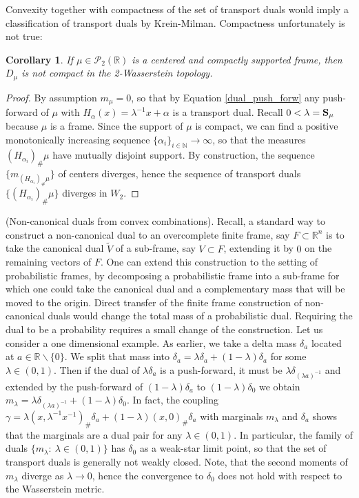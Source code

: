 \documentclass{amsart}
\numberwithin{equation}{section}
\newcommand\cP{{\mathcal P}}
\newcommand\bS{{\bf S}}
\newcommand\R{{\mathbb R}}
\newcommand\N{{\mathbb N}}
\theoremstyle{plain}
\newtheorem{corollary}[subsection]{Corollary}
\theoremstyle{definition}
\begin{document}
\noindent Convexity together with compactness of the set of transport duals would imply a classification of transport duals by Krein-Milman. 
Compactness unfortunately is not true:  
\begin{corollary} \label{non-compactness}
If $\mu \in \cP_2(\R)$ is a centered and compactly supported frame, then $D_{\mu}$ is not compact in the 2-Wasserstein topology.      
\end{corollary}
\begin{proof}
By assumption $m_{\mu}=0$, so that by Equation \ref{dual_push_forw} any push-forward of $\mu$ with $H_{\alpha}(x)=\lambda^{-1}x + \alpha$ is a transport dual. Recall $0< \lambda=\bS_{\mu}$ because $\mu$ is a frame.  Since the support of $\mu$ is compact, we can find a positive monotonically increasing sequence $\{\alpha_i\}_{i\in \N} \rightarrow \infty$,  
so that the measures $(H_{\alpha_i})_{\#}\mu$ have mutually disjoint support. By construction, the sequence $\{m_{(H_{\alpha_i})_{\#}\mu}\}$ of centers diverges, hence the sequence of transport duals $\{(H_{\alpha_i})_{\#}\mu\}$ diverges in $W_2$.  
\end{proof}





 (Non-canonical duals from convex combinations). Recall, a standard way to construct a non-canonical dual to an overcomplete finite frame, say $F \subset \R^n$ is to take the canonical dual $\widetilde{V}$ of a sub-frame, say $V \subset F$,  extending it by $0$ on the 
remaining vectors of $F$. 
One can extend this construction to the setting of probabilistic frames, by decomposing a probabilistic frame into 
a sub-frame for which one could take the canonical dual and a complementary mass that will be moved to the origin. 
Direct transfer of the finite frame construction of non-canonical duals would change the total mass of a probabilistic dual. 
Requiring the dual to be a probability requires a small change of the construction.   
Let us consider a one dimensional example. As earlier, we take a delta mass $\delta_a$ located at $a \in \R\backslash \{ 0 \}$. 
We split that mass into $\delta_a=\lambda \delta_a+ (1-\lambda)\delta_a$ for some $\lambda \in (0,1)$. 
Then if the dual of $\lambda \delta_a$  is a push-forward, it must be $\lambda \delta_{(\lambda a)^{-1}}$ and extended by the push-forward 
of $(1-\lambda)\delta_a$ to $(1-\lambda)\delta_0$ we obtain $m_{\lambda}=\lambda \delta_{(\lambda a)^{-1}} + (1-\lambda)\delta_0 $.  
In fact, the coupling $\gamma=\lambda(x,\lambda^{-1}x^{-1})_{\#}\delta_a + (1-\lambda)(x,0)_{\#}\delta_a$ with marginals $m_{\lambda}$ and $\delta_a$ 
shows that the marginals are a dual pair for any $\lambda \in (0,1)$. In particular, the family of duals $\{m_{\lambda}:\ \lambda \in (0,1)\}$  
has  $\delta_0$ as a weak-star limit point, so that the set of transport duals is generally not weakly closed. Note, that 
the second moments of $m_{\lambda}$ diverge as $\lambda \rightarrow 0$, hence the convergence to $\delta_0$ does not hold 
with respect to the Wasserstein metric.  
\end{document}

